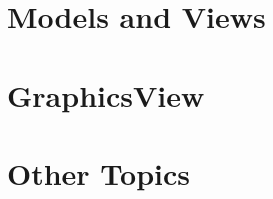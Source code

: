 \documentclass[t]{beamer}
\begin{document}
\part{Models and Views}



\part{GraphicsView}


%

\part{Other Topics}




\end{document}
